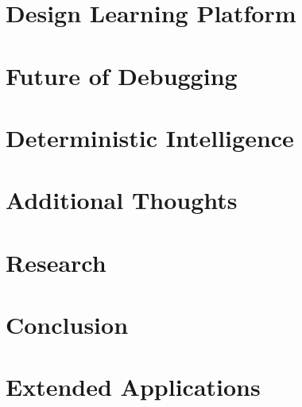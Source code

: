 \documentclass{article}
\begin{document}
\newpage
\section{Design Learning Platform}


\newpage
\section{Future of Debugging}


\newpage
\section{Deterministic Intelligence}


\newpage
\section{Additional Thoughts}


\newpage
\section{Research}


\newpage
\section{Conclusion}


\newpage
\section{Extended Applications}

\end{document}
